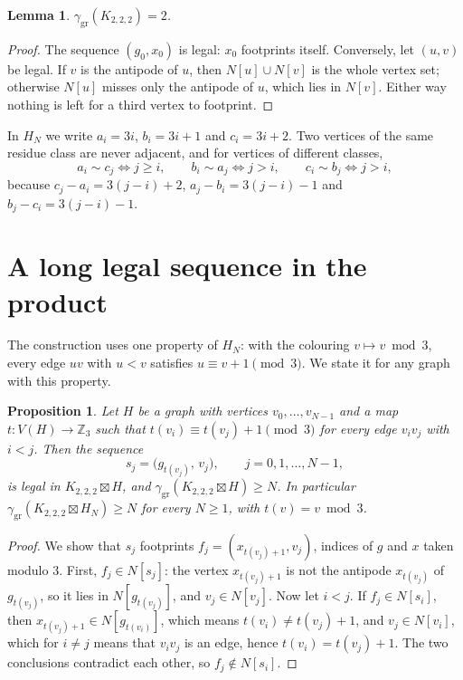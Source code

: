 \documentclass[screen]{aomart}
\newtheorem{proposition}[theorem]{Proposition}
\newtheorem{lemma}[theorem]{Lemma}
\theoremstyle{definition}
\theoremstyle{remark}
\numberwithin{equation}{section}
\newcommand{\ggr}{\gamma_{\mathrm{gr}}}
\newcommand{\sprod}{\boxtimes}
\newcommand{\oct}{K_{2,2,2}}
\begin{document}
\begin{lemma}\label{lem:oct}
$\ggr(\oct)=2$.
\end{lemma}

\begin{proof}
The sequence $(g_0,x_0)$ is legal: $x_0$ footprints itself. Conversely, let $(u,v)$ be legal. If $v$ is the antipode of $u$, then $N[u]\cup N[v]$ is the whole vertex set; otherwise $N[u]$ misses only the antipode of $u$, which lies in $N[v]$. Either way nothing is left for a third vertex to footprint.
\end{proof}

In $H_N$ we write $a_i=3i$, $b_i=3i+1$ and $c_i=3i+2$. Two vertices of the same residue class are never adjacent, and for vertices of different classes,
\begin{equation}\label{eq:adj}
  a_i\sim c_j\iff j\ge i,\qquad b_i\sim a_j\iff j>i,\qquad c_i\sim b_j\iff j>i,
\end{equation}
because $c_j-a_i=3(j-i)+2$, $a_j-b_i=3(j-i)-1$ and $b_j-c_i=3(j-i)-1$.

\section{A long legal sequence in the product}\label{sec:product}

The construction uses one property of $H_N$: with the colouring $v\mapsto v\bmod 3$, every edge $uv$ with $u<v$ satisfies $u\equiv v+1\pmod 3$. We state it for any graph with this property.

\begin{proposition}\label{prop:product}
Let $H$ be a graph with vertices $v_0,\dots,v_{N-1}$ and a map $t\colon V(H)\to\mathbb Z_3$ such that $t(v_i)\equiv t(v_j)+1\pmod3$ for every edge $v_iv_j$ with $i<j$. Then the sequence
\[
  s_j=\big(g_{t(v_j)},\,v_j\big),\qquad j=0,1,\dots,N-1,
\]
is legal in $\oct\sprod H$, and $\ggr(\oct\sprod H)\ge N$. In particular $\ggr(\oct\sprod H_N)\ge N$ for every $N\ge1$, with $t(v)=v\bmod3$.
\end{proposition}

\begin{proof}
We show that $s_j$ footprints $f_j=(x_{t(v_j)+1},v_j)$, indices of $g$ and $x$ taken modulo $3$. First, $f_j\in N[s_j]$: the vertex $x_{t(v_j)+1}$ is not the antipode $x_{t(v_j)}$ of $g_{t(v_j)}$, so it lies in $N[g_{t(v_j)}]$, and $v_j\in N[v_j]$. Now let $i<j$. If $f_j\in N[s_i]$, then $x_{t(v_j)+1}\in N[g_{t(v_i)}]$, which means $t(v_i)\ne t(v_j)+1$, and $v_j\in N[v_i]$, which for $i\neq j$ means that $v_iv_j$ is an edge, hence $t(v_i)=t(v_j)+1$. The two conclusions contradict each other, so $f_j\notin N[s_i]$.
\end{proof}
\end{document}

